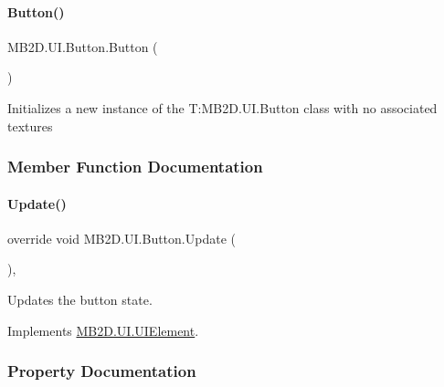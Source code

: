 \paragraph{\texorpdfstring{Button()}{Button()}\hspace{0.1cm}{\footnotesize\ttfamily [2/2]}}
{\footnotesize\ttfamily M\+B2\+D.\+U\+I.\+Button.\+Button (\begin{DoxyParamCaption}{ }\end{DoxyParamCaption})\hspace{0.3cm}{\ttfamily [inline]}}



Initializes a new instance of the T\+:\+M\+B2\+D.\+U\+I.\+Button class with no associated textures 



\subsubsection{Member Function Documentation}
\hypertarget{class_m_b2_d_1_1_u_i_1_1_button_a1686d24f172e05a1bf83fc3aa49cfab5}{}\label{class_m_b2_d_1_1_u_i_1_1_button_a1686d24f172e05a1bf83fc3aa49cfab5} 
\paragraph{\texorpdfstring{Update()}{Update()}}
{\footnotesize\ttfamily override void M\+B2\+D.\+U\+I.\+Button.\+Update (\begin{DoxyParamCaption}{ }\end{DoxyParamCaption})\hspace{0.3cm}{\ttfamily [inline]}, {\ttfamily [virtual]}}



Updates the button state. 



Implements \hyperlink{class_m_b2_d_1_1_u_i_1_1_u_i_element_aa97bcbe44f3fac8a13e2febca23b2d4d}{M\+B2\+D.\+U\+I.\+U\+I\+Element}.



\subsubsection{Property Documentation}
\hypertarget{class_m_b2_d_1_1_u_i_1_1_button_a92d0184df7962dd2aed3b8b0aa8c0d8e}{}\label{class_m_b2_d_1_1_u_i_1_1_button_a92d0184df7962dd2aed3b8b0aa8c0d8e} 

